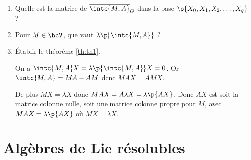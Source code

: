 \documentclass[a4paper,french,bookmarks]{article}
\begin{document}
\begin{enumerate}
        \item Quelle est la matrice de $\overline{\intc{M, A}}_G$ dans la base $\p{X_0, X_1, X_2, \dots, X_q}$ ?
        
        
        \item Pour $M \in \bcV$, que vaut $\lambda\p{\intc{M, A}}$ ?
        
        
        \item Établir le théorème {\sffamily\ref{th:th1}}.
        
        \begin{nproof}
            On a $\intc{M, A}X = \lambda\p{\intc{M, A}}X = 0$. Or $\intc{M, A} = MA - AM$ donc $MAX = AMX$.
            
            De plus $MX = \lambda X$ donc $MAX = A\lambda X = \lambda\p{AX}$. Donc $AX$ est soit la matrice colonne nulle, soit une matrice colonne propre pour $M$, avec $MAX = \lambda\p{AX}$ où $MX = \lambda X$. 
        \end{nproof}
    \end{enumerate}
    
    \section{Algèbres de Lie résolubles}
    
\end{document}
